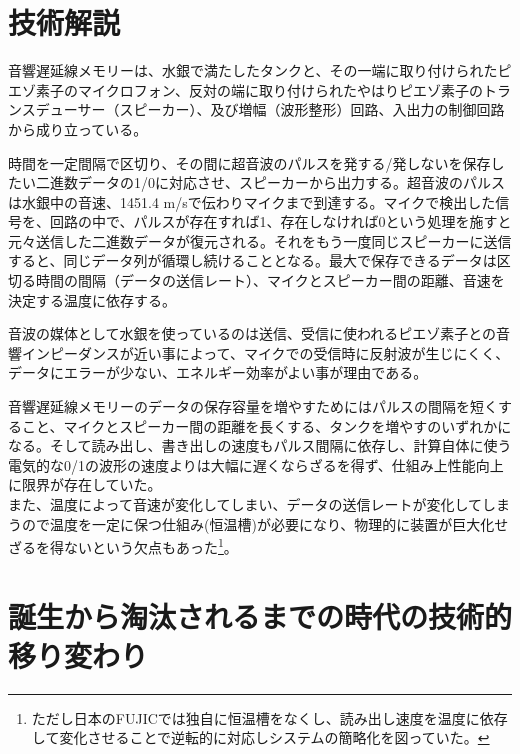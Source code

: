 \section{技術解説}\label{ux6280ux8853ux89e3ux8aac}

音響遅延線メモリーは、水銀で満たしたタンクと、その一端に取り付けられたピエゾ素子のマイクロフォン、反対の端に取り付けられたやはりピエゾ素子のトランスデューサー（スピーカー）、及び増幅（波形整形）回路、入出力の制御回路から成り立っている。

時間を一定間隔で区切り、その間に超音波のパルスを発する/発しないを保存したい二進数データの1/0に対応させ、スピーカーから出力する。超音波のパルスは水銀中の音速、1451.4
m/sで伝わりマイクまで到達する。マイクで検出した信号を、回路の中で、パルスが存在すれば1、存在しなければ0という処理を施すと元々送信した二進数データが復元される。それをもう一度同じスピーカーに送信すると、同じデータ列が循環し続けることとなる。最大で保存できるデータは区切る時間の間隔（データの送信レート）、マイクとスピーカー間の距離、音速を決定する温度に依存する。

音波の媒体として水銀を使っているのは送信、受信に使われるピエゾ素子との音響インピーダンスが近い事によって、マイクでの受信時に反射波が生じにくく、データにエラーが少ない、エネルギー効率がよい事が理由である。

音響遅延線メモリーのデータの保存容量を増やすためにはパルスの間隔を短くすること、マイクとスピーカー間の距離を長くする、タンクを増やすのいずれかになる。そして読み出し、書き出しの速度もパルス間隔に依存し、計算自体に使う電気的な0/1の波形の速度よりは大幅に遅くならざるを得ず、仕組み上性能向上に限界が存在していた。\\
また、温度によって音速が変化してしまい、データの送信レートが変化してしまうので温度を一定に保つ仕組み(恒温槽)が必要になり、物理的に装置が巨大化せざるを得ないという欠点もあった\footnote{ただし日本のFUJICでは独自に恒温槽をなくし、読み出し速度を温度に依存して変化させることで逆転的に対応しシステムの簡略化を図っていた。}。

\section{誕生から淘汰されるまでの時代の技術的移り変わり}\label{ux8a95ux751fux304bux3089ux6dd8ux6c70ux3055ux308cux308bux307eux3067ux306eux6642ux4ee3ux306eux6280ux8853ux7684ux79fbux308aux5909ux308fux308a}

